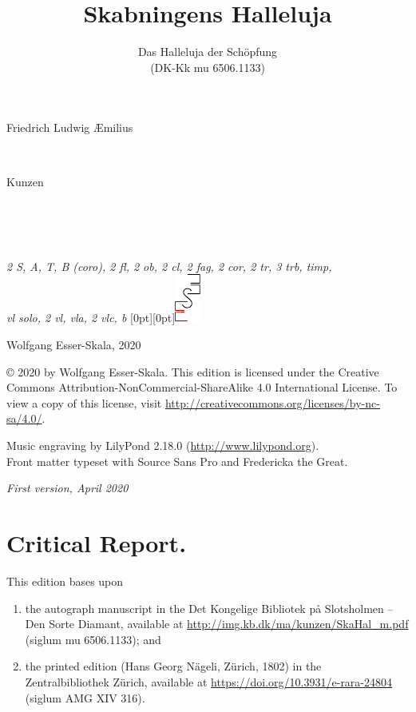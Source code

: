 \documentclass[parskip=full]{scrreprt}
\makeatletter
\DeclareRobustCommand{\sbseries}{\fontseries{sb}\selectfont}
\newcommand\fancytitlehead{
	\headingfont%
	\fontsize{80}{80}\selectfont\textcolor{black!80}{\@lastname.}\\[15pt]%
	\fontsize{60}{60}\selectfont\@ifundefined{@shorttitle}{\@title}{\@shorttitle}.%
}
\def\firstname#1{\def\@firstname{#1}}
\def\lastname#1{\def\@lastname{#1}}
\def\shorttitle#1{\def\@shorttitle{#1}}
\def\instrumentation#1{\def\@instrumentation{#1}}
\def\maketitle{%
\begin{titlepage}%
	\Large%
	{\@titlehead}%
	\vfill%
	{\strut\@firstname}\\%
	{\sbseries\color{oldred}\strut\@lastname}\\%
	{\strut\@namesuffix}%
	\vfill%
	{\sbseries\@title}\\%
	{\@subtitle}\\[\baselineskip]%
	{\itshape\@instrumentation}%
	\vfill%
	{\itshape\@parts}\hspace*{\fill}\raisebox{0pt}[0pt][0pt]{\includegraphics{ees_logo}}%
\end{titlepage}%
}
\newif\ifprintreport\printreportfalse
\makeatother
\begin{document}
\titlehead{\fancytitlehead}
\firstname{Friedrich Ludwig Æmilius} %
\lastname{Kunzen}
\title{Skabningens Halleluja}
\shorttitle{Skabningens\\Halleluja}
\subtitle{Das Halleluja der Schöpfung\\(DK-Kk mu 6506.1133)}
\instrumentation{2 S, A, T, B (coro), 2 fl, 2 ob, 2 cl, 2 fag, 2 cor, 2 tr, 3 trb, timp,\\vl solo, 2 vl, vla, 2 vlc, b}
\maketitle


\thispagestyle{empty}

\vspace*{\fill}

\hspace*{1em}Wolfgang Esser-Skala, 2020

© 2020 by Wolfgang Esser-Skala. This edition is licensed under the Creative Commons Attribution-NonCommercial-ShareAlike 4.0 International License. To view a copy of this license, visit \url{http://creativecommons.org/licenses/by-nc-sa/4.0/}. 

Music engraving by LilyPond 2.18.0 (\url{http://www.lilypond.org}).\\
Front matter typeset with Source Sans Pro and Fredericka the Great.

\textit{First version, April 2020}

\vspace*{2cm}

\ifprintreport
\chapter*{Critical Report.}

This edition bases upon
\begin{enumerate}
	\item the autograph manuscript in the Det Kongelige Bibliotek på Slotsholmen – Den Sorte Diamant, available at \url{http://img.kb.dk/ma/kunzen/SkaHal_m.pdf} (siglum mu 6506.1133); and
	\item the printed edition (Hans Georg Nägeli, Zürich, 1802) in the Zentralbibliothek Zürich, available at \url{https://doi.org/10.3931/e-rara-24804} (siglum AMG XIV 316).
\end{enumerate}
\end{document}
